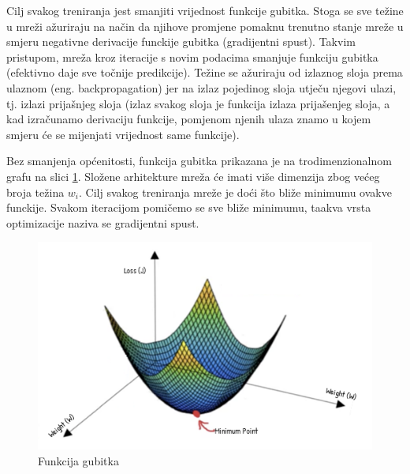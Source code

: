 

Cilj svakog treniranja jest smanjiti vrijednost funkcije gubitka. Stoga se sve težine u mreži
ažuriraju na način da njihove promjene pomaknu trenutno stanje mreže u smjeru negativne derivacije
funckije gubitka (gradijentni spust). Takvim pristupom, mreža kroz iteracije s novim podacima smanjuje funkciju gubitka
(efektivno daje sve točnije predikcije). Težine se ažuriraju od izlaznog sloja prema ulaznom 
(eng. backpropagation) jer na izlaz pojedinog sloja utječu njegovi ulazi, tj. izlazi prijašnjeg
sloja (izlaz svakog sloja je funkcija izlaza prijašenjeg sloja, a kad izračunamo derivaciju
funkcije, pomjenom njenih ulaza znamo u kojem smjeru će se mijenjati vrijednost same funkcije).



Bez smanjenja općenitosti, funkcija gubitka prikazana je na trodimenzionalnom grafu
na slici \ref{pic:descent}. Složene arhitekture mreža će imati više dimenzija zbog većeg broja
težina \( w_i \). Cilj svakog treniranja mreže je doći što bliže minimumu ovakve funckije.
Svakom iteracijom pomičemo se sve bliže minimumu, taakva vrsta optimizacije naziva se
gradijentni spust.

\begin{figure}[htb]
  \centering
  \includegraphics[width=0.5\linewidth]{Chapters/neuronska_mreza/descent.png} 
  \caption{Funkcija gubitka \cite{desc}}
  \label{pic:descent}
\end{figure}







